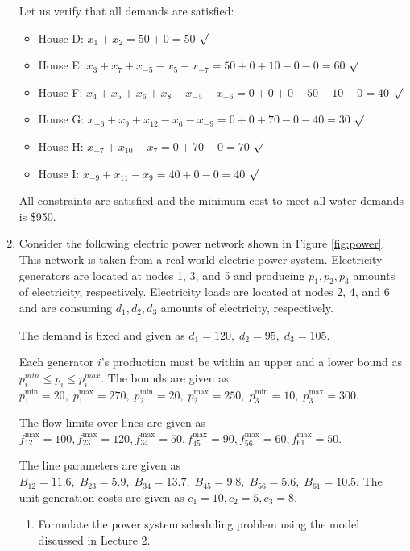 \documentclass[11pt]{article}
\begin{document}
\begin{enumerate}
Let us verify that all demands are satisfied:
\begin{itemize}
    \item House D: $x_1 + x_2 = 50 + 0 = 50$ $\surd$
    \item House E: $x_3 + x_7 + x_{-5} - x_5 - x_{-7} = 50 + 0 + 10 - 0 - 0 = 60$ $\surd$  
    \item House F: $x_4 + x_5 + x_6 + x_8 - x_{-5} - x_{-6} = 0 + 0 + 0 + 50 - 10 - 0 = 40$ $\surd$
    \item House G: $x_{-6} + x_9 + x_{12} - x_6 - x_{-9} = 0 + 0 + 70 - 0 - 40 = 30$ $\surd$
    \item House H: $x_{-7} + x_{10} - x_7 = 0 + 70 - 0 = 70$ $\surd$
    \item House I: $x_{-9} + x_{11} - x_9 = 40 + 0 - 0 = 40$ $\surd$
\end{itemize}

All constraints are satisfied and the minimum cost to meet all water demands is \$950.

	\newpage
	\item Consider the following electric power network shown in Figure \ref{fig:power}. This network is taken from a real-world electric power system. Electricity generators are located at nodes 1, 3, and 5 and producing $p_1, p_2, p_3$ amounts of electricity, respectively. Electricity loads are located at nodes 2, 4, and 6 and are consuming $d_1, d_2, d_3$ amounts of electricity, respectively. 
	
	The demand is fixed and given as $d_1 = 120, \; d_2 = 95, \; d_3 = 105$.
	
	Each generator $i$'s production must be within an upper and a lower bound as $p_i^{min}\le p_i \le p_i^{max}$. The bounds are given as $p_1^{\text{min}} = 20, \; p_1^{\text{max}} = 270,\; p_2^{\text{min}} = 20,\; p_2^{\text{max}} = 250, \; p_3^{\text{min}} = 10, \; p_3^{\text{max}} = 300$. 
	
	The flow limits over lines are given as $f_{12}^{\text{max}} = 100, f_{23}^{\text{max}} = 120, f_{34}^{\text{max}} = 50, f_{45}^{\text{max}} = 90, f_{56}^{\text{max}} = 60, f_{61}^{\text{max}} = 50$. 
	
	The line parameters are given as $B_{12} = 11.6, \; B_{23} = 5.9, \; B_{34} = 13.7, \; B_{45} = 9.8, \; B_{56} = 5.6, \; B_{61} = 10.5$. The unit generation costs are given as $c_1 = 10, c_2 = 5, c_3 = 8$.
	
	\begin{enumerate}
		\item Formulate the power system scheduling problem using the model discussed in Lecture 2. 
		

\end{enumerate}
\end{enumerate}
\end{document}
